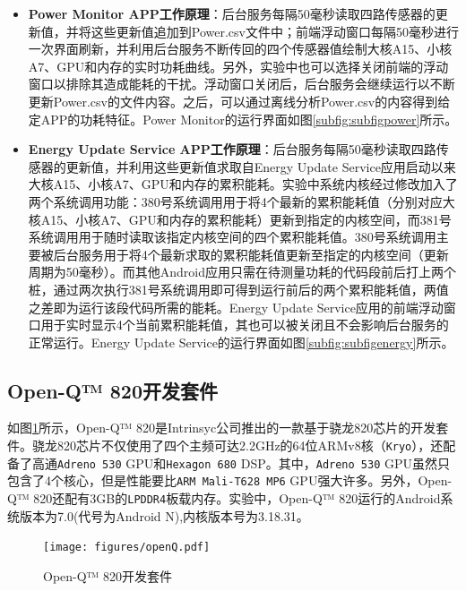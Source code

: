 \begin{itemize}
  \item \textbf{Power Monitor APP工作原理}：后台服务每隔50毫秒读取四路传感器的更新值，并将这些更新值追加到Power.csv文件中；前端浮动窗口每隔50毫秒进行一次界面刷新，并利用后台服务不断传回的四个传感器值绘制大核A15、小核A7、GPU和内存的实时功耗曲线。另外，实验中也可以选择关闭前端的浮动窗口以排除其造成能耗的干扰。浮动窗口关闭后，后台服务会继续运行以不断更新Power.csv的文件内容。之后，可以通过离线分析Power.csv的内容得到给定APP的功耗特征。Power Monitor的运行界面如图\ref{subfig:subfigpower}所示。
  \item \textbf{Energy Update Service APP工作原理}：后台服务每隔50毫秒读取四路传感器的更新值，并利用这些更新值求取自Energy Update Service应用启动以来大核A15、小核A7、GPU和内存的累积能耗。实验中系统内核经过修改加入了两个系统调用功能：380号系统调用用于将4个最新的累积能耗值（分别对应大核A15、小核A7、GPU和内存的累积能耗）更新到指定的内核空间，而381号系统调用用于随时读取该指定内核空间的四个累积能耗值。380号系统调用主要被后台服务用于将4个最新求取的累积能耗值更新至指定的内核空间（更新周期为50毫秒）。而其他Android应用只需在待测量功耗的代码段前后打上两个桩，通过两次执行381号系统调用即可得到运行前后的两个累积能耗值，两值之差即为运行该段代码所需的能耗。Energy Update Service应用的前端浮动窗口用于实时显示4个当前累积能耗值，其也可以被关闭且不会影响后台服务的正常运行。Energy Update Service的运行界面如图\ref{subfig:subfigenergy}所示。
\end{itemize}

\subsection{Open-Q™ 820开发套件}
\label{chapter:chapter2-5-2}

如图\ref{figure:figureopenQ}所示，Open-Q™ 820是Intrinsyc公司推出的一款基于骁龙820芯片的开发套件。骁龙820芯片不仅使用了四个主频可达2.2GHz的64位ARMv8核（\texttt{Kryo}），还配备了高通\texttt{Adreno 530} GPU和\texttt{Hexagon 680} DSP。其中，\texttt{Adreno 530} GPU虽然只包含了4个核心，但是性能要比\texttt{ARM Mali-T628 MP6} GPU强大许多。另外，Open-Q™ 820还配有3GB的\texttt{LPDDR4}板载内存。实验中，Open-Q™ 820运行的Android系统版本为7.0(代号为Android N),内核版本号为3.18.31。

\begin{figure}[htbp]
    \begin{center}
    \texttt{[image: figures/openQ.pdf]}
    \end{center}
    \caption{Open-Q™ 820开发套件}\label{figure:figureopenQ}
\end{figure}

